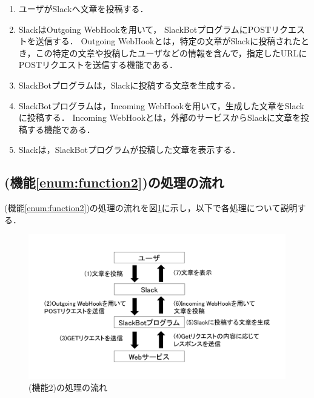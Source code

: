 \documentclass[12pt]{jsarticle}
\begin{document}
\begin{enumerate}
\item ユーザがSlackへ文章を投稿する．
\item SlackはOutgoing WebHookを用いて，%
  SlackBotプログラムにPOSTリクエストを送信する．
  Outgoing WebHookとは，特定の文章がSlackに投稿されたとき，この特定の文章や投稿したユーザなどの情報を含んで，指定したURLにPOSTリクエストを送信する機能である．
\item SlackBotプログラムは，Slackに投稿する文章を生成する．
\item SlackBotプログラムは，Incoming WebHookを用いて，生成した文章をSlackに投稿する．
  Incoming WebHookとは，外部のサービスからSlackに文章を投稿する機能である．
\item Slackは，SlackBotプログラムが投稿した文章を表示する．
\end{enumerate}

\subsection{(機能\ref{enum:function2})の処理の流れ}
(機能\ref{enum:function2})の処理の流れを図\ref{fig:slackbot_flow2}に示し，以下で各処理について説明する．
  \begin{figure}[t]
    \centering
    \includegraphics[width=1\textwidth]{figs/slackbot_flow9.png}
    \caption{(機能2)の処理の流れ}
    \label{fig:slackbot_flow2}
  \end{figure}
\end{document}
